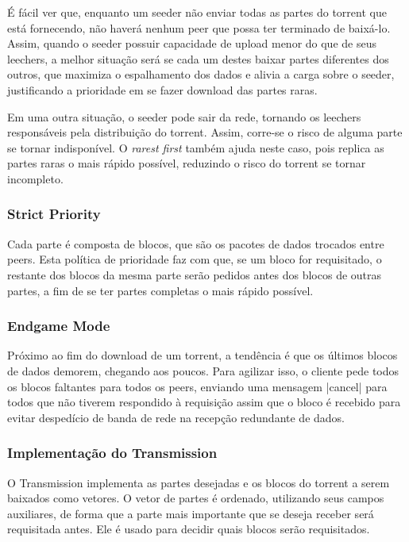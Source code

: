 É fácil ver que, enquanto um \gls*{seeder} não enviar todas as partes do \gls*{torrent}
que está fornecendo, não haverá nenhum \gls*{peer} que possa ter terminado de baixá-lo.
Assim, quando o \gls*{seeder} possuir capacidade de upload menor do que de seus
\glspl*{leecher}, a melhor situação será se cada um destes baixar partes diferentes dos
outros, que maximiza o espalhamento dos dados e alivia a carga sobre o \gls*{seeder},
justificando a prioridade em se fazer download das partes raras.

Em uma outra situação, o \gls*{seeder} pode sair da rede, tornando os \glspl*{leecher}
responsáveis pela distribuição do \gls*{torrent}. Assim, corre-se o risco de alguma
parte se tornar indisponível. O \emph{rarest first} também ajuda neste caso, pois
replica as partes raras o mais rápido possível, reduzindo o risco do \gls*{torrent} se
tornar incompleto.

\subsubsection*{Strict Priority}

Cada parte é composta de blocos, que são os pacotes de dados trocados entre
\glspl*{peer}. Esta política de prioridade faz com que, se um bloco for requisitado, o
restante dos blocos da mesma parte serão pedidos antes dos blocos de outras partes, a
fim de se ter partes completas o mais rápido possível.

\subsubsection*{Endgame Mode}

Próximo ao fim do download de um \gls*{torrent}, a tendência é que os últimos blocos de
dados demorem, chegando aos poucos. Para agilizar isso, o cliente pede todos os blocos
faltantes para todos os \glspl*{peer}, enviando uma mensagem \bverb|cancel| para todos
que não tiverem respondido à requisição assim que o bloco é recebido para evitar
despedício de banda de rede na recepção redundante de dados.

\subsubsection*{Implementação do Transmission}

O Transmission implementa as partes desejadas e os blocos do \gls*{torrent} a serem
baixados como vetores. O vetor de partes é ordenado, utilizando seus campos auxiliares,
de forma que a parte mais importante que se deseja receber será requisitada antes. Ele
é usado para decidir quais blocos serão requisitados.

